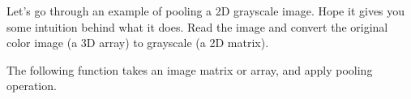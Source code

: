 \documentclass[12pt,]{krantz}
\makeatletter
\newenvironment{Shaded}{\begin{snugshade}}{\end{snugshade}}
\newcommand{\CommentTok}[1]{\textcolor[rgb]{0.37,0.37,0.37}{\textit{#1}}}
\newcommand{\DecValTok}[1]{\textcolor[rgb]{0.06,0.06,0.06}{#1}}
\newcommand{\KeywordTok}[1]{\textcolor[rgb]{0.27,0.27,0.27}{\textbf{#1}}}
\newcommand{\NormalTok}[1]{#1}
\newcommand{\OperatorTok}[1]{\textcolor[rgb]{0.43,0.43,0.43}{\textbf{#1}}}
\newcommand{\StringTok}[1]{\textcolor[rgb]{0.5,0.5,0.5}{#1}}
\newenvironment{kframe}{%
\medskip{}
\setlength{\fboxsep}{.8em}
 \def\at@end@of@kframe{}%
 \ifinner\ifhmode%
  \def\at@end@of@kframe{\end{minipage}}%
  \begin{minipage}{\columnwidth}%
 \fi\fi%
 \def\FrameCommand##1{\hskip\@totalleftmargin \hskip-\fboxsep
 \colorbox{shadecolor}{##1}\hskip-\fboxsep
     \hskip-\linewidth \hskip-\@totalleftmargin \hskip\columnwidth}%
 \MakeFramed {\advance\hsize-\width
   \@totalleftmargin\z@ \linewidth\hsize
   \@setminipage}}%
 {\par\unskip\endMakeFramed%
 \at@end@of@kframe}
\renewenvironment{Shaded}{\begin{kframe}}{\end{kframe}}
\makeatother
\begin{document}
Let's go through an example of pooling a 2D grayscale image. Hope it gives you some intuition behind what it does. Read the image and convert the original color image (a 3D array) to grayscale (a 2D matrix).

\begin{Shaded}
\end{Shaded}

The following function takes an image matrix or array, and apply pooling operation.
\end{document}
